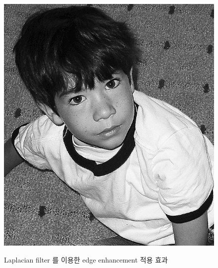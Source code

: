 \documentclass[a4paper, 12p]{paper}
\begin{document}
\begin{figure}[hbtp]
{\includegraphics[scale=0.21]{../data/laplace4_en_extpad.png}
}
\caption{Laplacian filter 를 이용한 edge enhancement 적용 효과}\label{fig:edgeenhance_result}
\end{figure}
\end{document}
